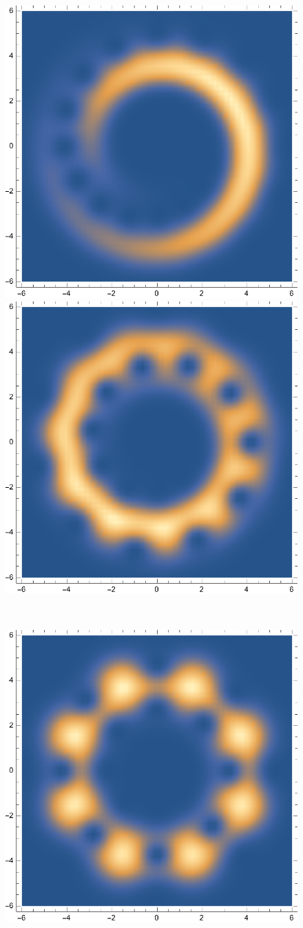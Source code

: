 \documentclass{article}
\theoremstyle{definition}
\begin{document}
\begin{enumerate}[label=\alph*)]
\begin{figure}[!htb]
\begin{minipage}{.24\textwidth}
  	\includegraphics[width=.7\linewidth]{figures/5-8.eps}
	\end{minipage}
	\begin{minipage}{.24\textwidth}
  	\centering
  	\includegraphics[width=.7\linewidth]{figures/5-12.eps}
	\end{minipage} \\ 
	\begin{minipage}{.24\textwidth}
  	\centering
  	\includegraphics[width=.7\linewidth]{figures/5-16.eps}

\end{minipage}
\end{figure}
\end{enumerate}
\end{document}
